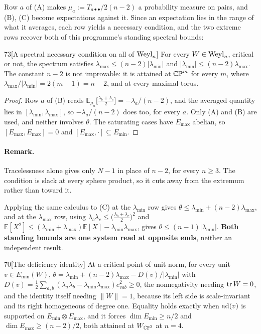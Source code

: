 Row $a$ of (A) makes $\mu_a:=T_{a\bullet\bullet}/2(n-2)$ a probability measure on pairs, and (B), (C) become expectations against it. Since an expectation lies in the range of what it averages, each row yields a necessary condition, and the two extreme rows recover both of this programme's standing spectral bounds:

\begin{Lem}{73}[A spectral necessary condition on all of $\mathrm{Weyl}_n$]
For every $W\in\mathrm{Weyl}_n$, critical or not, the spectrum satisfies $\lambda_{\max}\le(n-2)\lvert\lambda_{\min}\rvert$ and $\lvert\lambda_{\min}\rvert\le(n-2)\lambda_{\max}$. The constant $n-2$ is not improvable: it is attained at $\mathbb{CP}^m$ for every $m$, where $\lambda_{\max}/\lvert\lambda_{\min}\rvert=2(m-1)=n-2$, and at every maximal torus.
\end{Lem}

\begin{proof}
Row $a$ of (B) reads $\mathbb E_{\mu_a}\big[\tfrac{\lambda_b+\lambda_c}2\big]=-\lambda_a/(n-2)$, and the averaged quantity lies in $[\lambda_{\min},\lambda_{\max}]$, so $-\lambda_a/(n-2)$ does too, for every $a$. Only (A) and (B) are used, and neither involves $\theta$. The saturating cases have $E_{\max}$ abelian, so $[E_{\max},E_{\max}]=0$ and $[E_{\max},\cdot]\subseteq E_{\min}$.
\end{proof}

\paragraph{Remark.}
Tracelessness alone gives only $N-1$ in place of $n-2$, for every $n\ge3$. The condition is slack at every sphere product, so it cuts away from the extremum rather than toward it.

Applying the same calculus to (C) at the $\lambda_{\min}$ row gives $\theta\le\lambda_{\min}+(n-2)\lambda_{\max}$, and at the $\lambda_{\max}$ row, using $\lambda_b\lambda_c\le\big(\tfrac{\lambda_b+\lambda_c}2\big)^2$ and $\mathbb E[X^2]\le(\lambda_{\min}+\lambda_{\max})\mathbb E[X]-\lambda_{\min}\lambda_{\max}$, gives $\theta\le(n-1)\lvert\lambda_{\min}\rvert$. \textbf{Both standing bounds are one system read at opposite ends}, neither an independent result.

\begin{Lem}{70}[The deficiency identity]
At a critical point of unit norm, for every unit $v\in E_{\min}(W)$,
$\theta=\lambda_{\min}+(n-2)\lambda_{\max}-D(v)/\lvert\lambda_{\min}\rvert$ with $D(v)=\tfrac12\sum_{a,b}(\lambda_a\lambda_b-\lambda_{\min}\lambda_{\max})c_{vab}^2\ge0$, the nonnegativity needing $\operatorname{tr} W=0$, and the identity itself needing $\lVert W\rVert=1$, because its left side is scale-invariant and its right homogeneous of degree one. Equality holds exactly when $\mathrm{ad}(v)$ is supported on $E_{\min}\otimes E_{\max}$, and it forces $\dim E_{\min}\ge n/2$ and $\dim E_{\max}\ge(n-2)/2$, both attained at $W_{\mathbb{CP}^2}$ at $n=4$.
\end{Lem}

